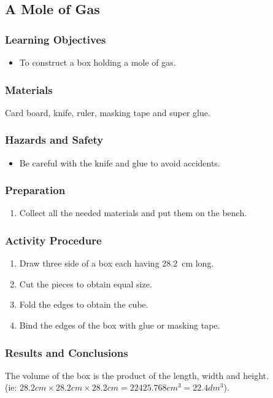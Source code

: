 \subsection{A Mole of Gas}

\subsubsection*{Learning Objectives}
\begin{itemize}
\item{To construct a box holding a mole of gas}.
\end{itemize}

\subsubsection*{Materials}
Card board, knife, ruler, masking tape and super glue.

\subsubsection*{Hazards and Safety}
\begin{itemize}
\item{Be careful with the knife and glue to avoid accidents.}
\end{itemize}

\subsubsection*{Preparation}
\begin{enumerate}
\item{Collect all the needed materials and put them on the bench.}
\end{enumerate}

\subsubsection*{Activity Procedure}
\begin{enumerate}
\item{Draw three side of a box each having 28.2~cm long.}
\item{Cut the pieces to obtain equal size.}
\item{Fold the edges to obtain the cube.}
\item{Bind the edges of the box with glue or masking tape.}
\end{enumerate}

\subsubsection*{Results and Conclusions}
The volume of the box is the product of the length, width and height. \\(ie: $28.2 cm \times 28.2 cm \times 28.2cm = 22425.768cm^{3} = 22.4dm^{3}$).

